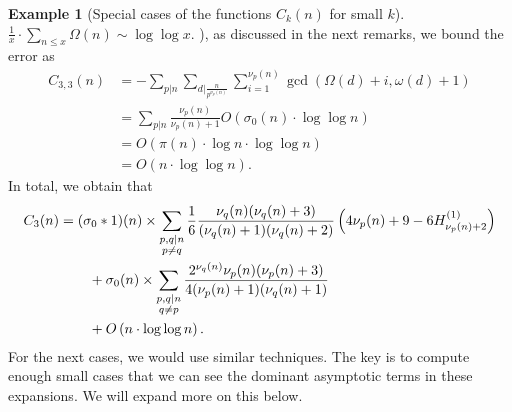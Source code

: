\documentclass[11pt,reqno,a4letter]{article}
\numberwithin{figure}{section}
\numberwithin{table}{section}
\theoremstyle{plain}
\numberwithin{theorem}{section}
\theoremstyle{definition}
\newtheorem{example}[theorem]{Example}
\begin{document}
\begin{example}[Special cases of the functions $C_k(n)$ for small $k$]
{     $\frac{1}{x} \cdot \sum_{n \leq x} \Omega(n) \sim \log\log x$. 
}), as discussed in the next remarks, we bound the 
error as 
\begin{align*} 
C_{3,3}(n) & = -\sum_{p|n} \sum_{d\rvert\frac{n}{p^{\nu_p(n)}}} \sum_{i=1}^{\nu_p(n)} 
     \gcd\left(\Omega(d) + i, \omega(d) + 1\right) \\ 
     & = \sum_{p|n} \frac{\nu_p(n)}{\nu_p(n) + 1} O\left(\sigma_0(n) \cdot \log\log n\right) \\ 
     & = O\left(\pi(n) \cdot \log n \cdot \log\log n\right) \\ 
     & = O\left(n \cdot \log\log n\right). 
\end{align*} 
In total, we obtain that 
\begin{align} 
\label{eqn_ExactFormula_Ck3n} 
C_3(n) & = (\sigma_0 \ast 1)(n) \times \sum_{\substack{p,q|n \\ p \neq q}} 
     \frac{1}{6}\frac{\nu_q(n) (\nu_q(n) + 3)}{ 
     (\nu_q(n)+1)(\nu_q(n)+2)} \left(4\nu_p(n)+9-6 H_{\nu_p(n)+2}^{(1)}\right) \\ 
\notag 
     & \phantom{= \quad\ } + 
     \sigma_0(n) \times \sum_{\substack{p,q|n \\ q \neq p}} 
     \frac{2^{\nu_q(n)} \nu_p(n) (\nu_p(n) + 3)}{4 (\nu_p(n) + 1) (\nu_q(n) + 1)} \\ 
\notag
     & \phantom{= \quad\ } + 
     O\left(n \cdot \log\log n\right). 
\end{align} 
For the next cases, we would use similar techniques. The key is to compute enough small cases that we can see 
the dominant asymptotic terms in these expansions. We will expand more on this below. 
\end{example}
\end{document}
